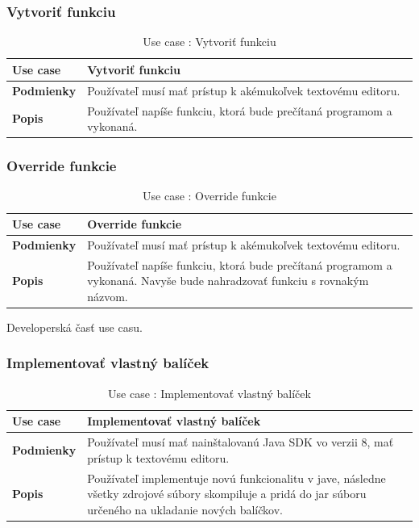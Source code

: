 \subsubsection{Vytvoriť funkciu}
\begin{center}
	\begin{table}[htbp]
		\begin{tabular}{|p{2.5cm}|p{14cm}|}
			\hline
			\textbf{Use case} & Vytvoriť funkciu \\ 
			\hline
			\textbf{Podmienky} & Používateľ musí mať prístup k akémukoľvek textovému editoru.  \\ 
			\hline
			\textbf{Popis} & Používateľ napíše funkciu, ktorá bude prečítaná programom a vykonaná.\\ 
			\hline
		\end{tabular}
		\label{table:1}
		\caption{Use case : Vytvoriť funkciu}
	\end{table}
\end{center}
\subsubsection{Override funkcie}
\begin{center}
	\begin{table}[htbp]
		\begin{tabular}{|p{2.5cm}|p{14cm}|}
			\hline
			\textbf{Use case} & Override funkcie \\ 
			\hline
			\textbf{Podmienky} & Používateľ musí mať prístup k akémukoľvek textovému editoru.  \\ 
			\hline
			\textbf{Popis} & Používateľ napíše funkciu, ktorá bude prečítaná programom a vykonaná. Navyše bude nahradzovať funkciu s rovnakým názvom.\\ 
			\hline
		\end{tabular}
		\label{table:1}
		\caption{Use case : Override funkcie}
	\end{table}
\end{center}
Developerská časť use casu.
\subsubsection{Implementovať vlastný balíček}
\begin{center}
	\begin{table}[htbp]
		\begin{tabular}{|p{2.5cm}|p{14cm}|}
			\hline
			\textbf{Use case} & Implementovať vlastný balíček \\ 
			\hline
			\textbf{Podmienky} & Používateľ musí mať nainštalovanú Java SDK vo verzii 8, mať prístup k textovému editoru.  \\ 
			\hline
			\textbf{Popis} & Používateľ implementuje novú funkcionalitu v jave, následne všetky zdrojové súbory skompiluje a pridá do jar súboru určeného na ukladanie nových balíčkov.\\ 
			\hline
		\end{tabular}
		\label{table:1}
		\caption{Use case : Implementovať vlastný balíček}
	\end{table}
\end{center}
\newpage
